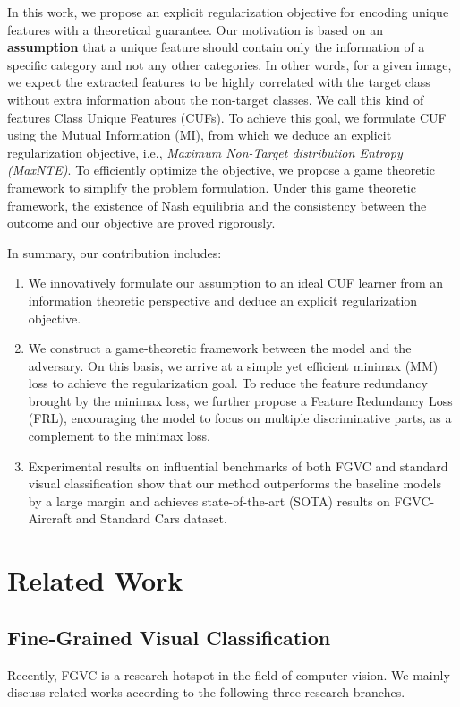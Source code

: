 \documentclass{article}
\theoremstyle{definition}
\begin{document}
In this work, we propose an explicit regularization objective for encoding unique features with a theoretical guarantee. Our motivation is based on an \textbf{assumption} that a unique feature should contain only the information of a specific category and not any other categories. In other words, for a given image, we expect the extracted features to be highly correlated with the target class without extra information about the non-target classes. We call this kind of features Class Unique Features (CUFs). To achieve this goal, we formulate CUF using the Mutual Information (MI), from which we deduce an explicit regularization objective, i.e., \textit{Maximum Non-Target distribution Entropy (MaxNTE)}. To efficiently optimize the objective, we propose a game theoretic framework to simplify the problem formulation. Under this game theoretic framework, the existence of Nash equilibria and the consistency between the outcome and our objective are proved rigorously. 

In summary, our contribution includes:
\begin{enumerate}
\item We innovatively formulate our assumption to an ideal CUF learner from an information theoretic perspective and deduce an explicit regularization objective.

\item We construct a game-theoretic framework between the model and the adversary. On this basis, we arrive at a simple yet efficient minimax (MM) loss to achieve the regularization goal. To reduce the feature redundancy brought by the minimax loss, we further propose a Feature Redundancy Loss (FRL), encouraging the model to focus on multiple discriminative parts, as a complement to the minimax loss.

\item Experimental results on influential benchmarks of both FGVC and standard visual classification show that our method outperforms the baseline models by a large margin and achieves state-of-the-art (SOTA) results on FGVC-Aircraft and Standard Cars dataset.
\end{enumerate}

\section{Related Work}

\subsection{Fine-Grained Visual Classification}
Recently, FGVC is a research hotspot in the field of computer vision. We mainly discuss related works according to the following three research branches.
\end{document}
